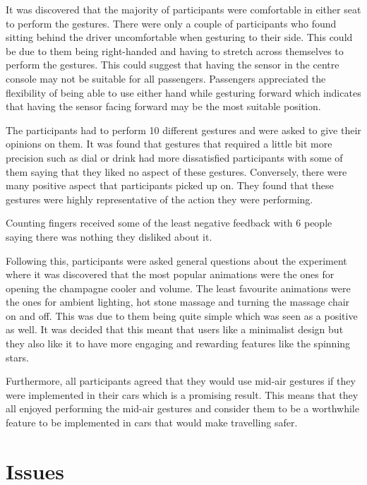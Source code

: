 \documentclass{l4proj}
\begin{document}
It was discovered that the majority of participants were comfortable in either seat to perform the gestures. There were only a couple of participants who found sitting behind the driver uncomfortable when gesturing to their side. This could be due to them being right-handed and having to stretch across themselves to perform the gestures. This could suggest that having the sensor in the centre console may not be suitable for all passengers. Passengers appreciated the flexibility of being able to use either hand while gesturing forward which indicates that having the sensor facing forward may be the most suitable position. 

The participants had to perform 10 different gestures and were asked to give their opinions on them. It was found that gestures that required a little bit more precision such as dial or drink had more dissatisfied participants with some of them saying that they liked no aspect of these gestures. Conversely, there were many positive aspect that participants picked up on. They found that these gestures were highly representative of the action they were performing. 

Counting fingers received some of the least negative feedback with 6 people saying there was nothing they disliked about it.

Following this, participants were asked general questions about the experiment where it was discovered that the most popular animations were the ones for opening the champagne cooler and volume. The least favourite animations were the ones for ambient lighting, hot stone massage and turning the massage chair on and off. This was due to them being quite simple which was seen as a positive as well. It was decided that this meant that users like a minimalist design but they also like it to have more engaging and rewarding features like the spinning stars. 

Furthermore, all participants agreed that they would use mid-air gestures if they were implemented in their cars which is a promising result. This means that they all enjoyed performing the mid-air gestures and consider them to be a worthwhile feature to be implemented in cars that would make travelling safer.



\section{Issues}
\end{document}
